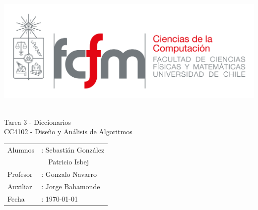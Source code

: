 \documentclass[12pt,letterpaper,hidelinks]{extarticle}
\begin{document}
\thispagestyle{empty}
\renewcommand*\listtablename{Índice de tablas}
\renewcommand{\contentsname}{\'Indice}
\renewcommand*{\refname}{}

\newpage
\pagestyle{fancy}
\fancyhf{}
\hbox{\includegraphics[scale=0.3]{img/fcfm_dcc_png.png} }
\vspace*{4cm}
\begin{center}
\Huge  {Tarea 3 - Diccionarios}\\
\vspace{1cm}
\Large {CC4102 - Diseño y Análisis de Algoritmos}\\
\end{center}

\vfill
\begin{flushright}
\begin{table}[h]
	\large
  \raggedleft
	\begin{tabular}{ll}
		Alumnos&: Sebastián González\\
				&\ \ Patricio Isbej\\
		Profesor&: Gonzalo Navarro\\
		Auxiliar&: Jorge Bahamonde\\
		Fecha&: \today
	\end{tabular}
\end{table}
\end{flushright}

\newpage
\pagestyle{fancy}
\fancyhf{}

\fancyhead[R]{\small \rm \textbf{\thepage}} %


\end{document}
